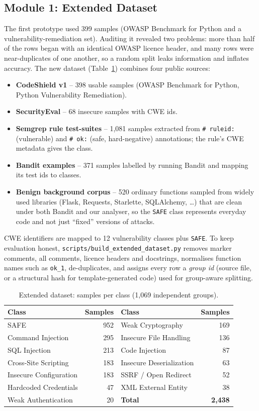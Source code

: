 \documentclass[11pt,a4paper,twoside]{report}
\begin{document}
\subsection{Module 1: Extended Dataset}
The first prototype used 399 samples (OWASP Benchmark for Python \cite{owaspbench} and a vulnerability-remediation set). Auditing it revealed two problems: more than half of the rows began with an identical OWASP licence header, and many rows were near-duplicates of one another, so a random split leaks information and inflates accuracy. The new dataset (Table~\ref{tab:data}) combines four public sources:
\begin{itemize}[noitemsep]
  \item \textbf{CodeShield v1} -- 398 usable samples (OWASP Benchmark for Python, Python Vulnerability Remediation).
  \item \textbf{SecurityEval} \cite{siddiq2022} -- 68 insecure samples with CWE ids.
  \item \textbf{Semgrep rule test-suites} \cite{semgrep} -- 1{,}081 samples extracted from \texttt{\# ruleid:} (vulnerable) and \texttt{\# ok:} (safe, hard-negative) annotations; the rule's CWE metadata gives the class.
  \item \textbf{Bandit examples} \cite{bandit} -- 371 samples labelled by running Bandit and mapping its test ids to classes.
  \item \textbf{Benign background corpus} -- 520 ordinary functions sampled from widely used libraries (Flask, Requests, Starlette, SQLAlchemy, \ldots) that are clean under both Bandit and our analyser, so the \texttt{SAFE} class represents everyday code and not just ``fixed'' versions of attacks.
\end{itemize}
CWE identifiers are mapped to 12 vulnerability classes plus \texttt{SAFE}. To keep evaluation honest, \texttt{scripts/build\_extended\_dataset.py} removes marker comments, all comments, licence headers and docstrings, normalises function names such as \texttt{ok\_1}, de-duplicates, and assigns every row a \emph{group id} (source file, or a structural hash for template-generated code) used for group-aware splitting.

\begin{table}[H]
\centering\small
\begin{tabular}{lrlr}
\toprule
Class & Samples & Class & Samples\\
\midrule
SAFE & 952 & Weak Cryptography & 169\\
Command Injection & 295 & Insecure File Handling & 136\\
SQL Injection & 213 & Code Injection & 87\\
Cross-Site Scripting & 183 & Insecure Deserialization & 63\\
Insecure Configuration & 183 & SSRF / Open Redirect & 52\\
Hardcoded Credentials & 47 & XML External Entity & 38\\
Weak Authentication & 20 & \textbf{Total} & \textbf{2{,}438}\\
\bottomrule
\end{tabular}
\caption{Extended dataset: samples per class (1{,}069 independent groups).}
\label{tab:data}
\end{table}
\end{document}
